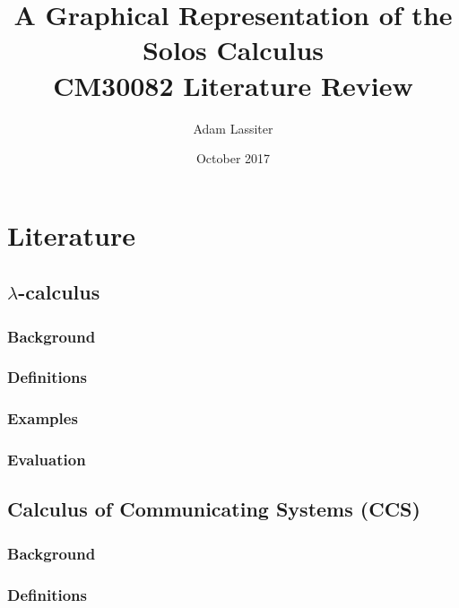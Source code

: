 \documentclass{article}
\title{A Graphical Representation of the Solos Calculus \\
	\large CM30082 Literature Review}
\author{Adam Lassiter}
\date{October 2017}
\begin{document}
\maketitle

\vfill

\tableofcontents

\pagebreak



\section{Literature}

    \subsection{$\lambda$-calculus}
        \subsubsection{Background}
            \cite{lambda-calculus}

        \subsubsection{Definitions}

        \subsubsection{Examples}

        \subsubsection{Evaluation}


    \subsection{Calculus of Communicating Systems (CCS)}
        \subsubsection{Background}

        \subsubsection{Definitions}
\end{document}
